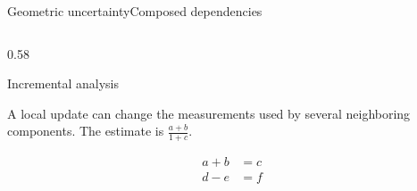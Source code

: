 \documentclass[12pt,aspectratio=43]{beamer}
\begin{document}
\begin{frame}[t,shrink=5]{Geometric uncertainty}{Composed dependencies}
{\begin{columns}[onlytextwidth,T]
\begin{column}{0.58\textwidth}
\begin{alertblock}{Incremental analysis}
\begin{description}
\item<1->[Stage 1] \textrm{A local update} can change the measurements used by several neighboring components.  The estimate is $\frac{a+b}{1+c}$.
\item<2->[Stage 2] \[\begin{aligned}a+b&=c\\ d-e&=f\end{aligned}\]
\end{description}
\end{alertblock}
\end{column}
\end{columns}}
\par {}
\end{frame}
\end{document}
